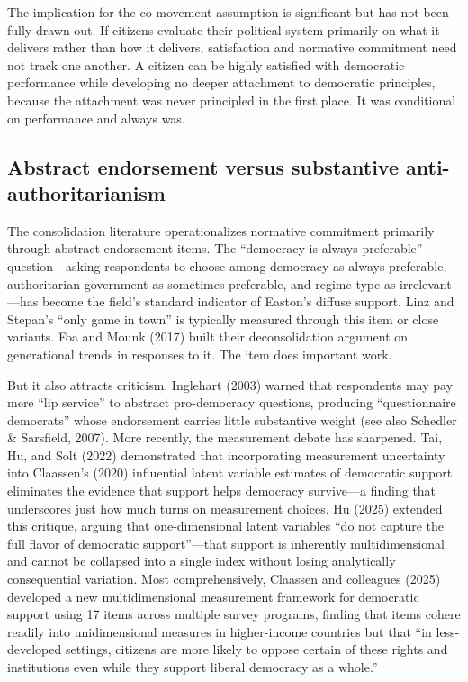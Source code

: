 \documentclass[
  12pt,
  12pt,
  letterpaper]{article}
\begin{document}
The implication for the co-movement assumption is significant but has
not been fully drawn out. If citizens evaluate their political system
primarily on what it delivers rather than how it delivers, satisfaction
and normative commitment need not track one another. A citizen can be
highly satisfied with democratic performance while developing no deeper
attachment to democratic principles, because the attachment was never
principled in the first place. It was conditional on performance and
always was.

\subsection{Abstract endorsement versus substantive
anti-authoritarianism}\label{abstract-endorsement-versus-substantive-anti-authoritarianism}

The consolidation literature operationalizes normative commitment
primarily through abstract endorsement items. The ``democracy is always
preferable'' question---asking respondents to choose among democracy as
always preferable, authoritarian government as sometimes preferable, and
regime type as irrelevant---has become the field's standard indicator of
Easton's diffuse support. Linz and Stepan's ``only game in town'' is
typically measured through this item or close variants. Foa and Mounk
(2017) built their deconsolidation argument on generational trends in
responses to it. The item does important work.

But it also attracts criticism. Inglehart (2003) warned that respondents
may pay mere ``lip service'' to abstract pro-democracy questions,
producing ``questionnaire democrats'' whose endorsement carries little
substantive weight (see also Schedler \& Sarsfield, 2007). More
recently, the measurement debate has sharpened. Tai, Hu, and Solt (2022)
demonstrated that incorporating measurement uncertainty into Claassen's
(2020) influential latent variable estimates of democratic support
eliminates the evidence that support helps democracy survive---a finding
that underscores just how much turns on measurement choices. Hu (2025)
extended this critique, arguing that one-dimensional latent variables
``do not capture the full flavor of democratic support''---that support
is inherently multidimensional and cannot be collapsed into a single
index without losing analytically consequential variation. Most
comprehensively, Claassen and colleagues (2025) developed a new
multidimensional measurement framework for democratic support using 17
items across multiple survey programs, finding that items cohere readily
into unidimensional measures in higher-income countries but that ``in
less-developed settings, citizens are more likely to oppose certain of
these rights and institutions even while they support liberal democracy
as a whole.''
\end{document}
